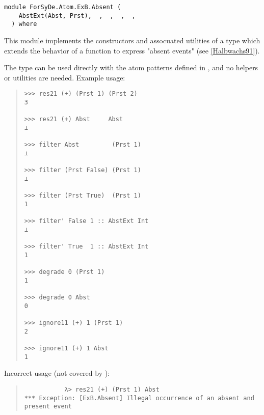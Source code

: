 \label{module:ForSyDe.Atom.ExB.Absent}
\haddockbeginheader
{\haddockverb\begin{verbatim}
module ForSyDe.Atom.ExB.Absent (
    AbstExt(Abst, Prst),  ,  ,  ,  , 
  ) where\end{verbatim}}
\haddockendheader

This module implements the constructors and assocuated utilities of
 a type which extends the behavior of a function to express "absent
 events" (see \href{ForSyDe-Atom.html#halbwachs91}{[Halbwachs91]}).\par
The  type can be used directly with the atom patterns
 defined in , and no helpers or utilities are
 needed. Example usage:\par
\begin{quote}
{\haddockverb\begin{verbatim}
>>> res21 (+) (Prst 1) (Prst 2)
3

>>> res21 (+) Abst     Abst
⟂

>>> filter Abst         (Prst 1)
⟂

>>> filter (Prst False) (Prst 1)
⟂

>>> filter (Prst True)  (Prst 1)
1

>>> filter' False 1 :: AbstExt Int
⟂

>>> filter' True  1 :: AbstExt Int
1

>>> degrade 0 (Prst 1)
1

>>> degrade 0 Abst
0

>>> ignore11 (+) 1 (Prst 1)
2

>>> ignore11 (+) 1 Abst
1

\end{verbatim}}
\end{quote}Incorrect usage (not covered by ):\par
           \begin{quote}
           {\haddockverb\begin{verbatim}
           λ> res21 (+) (Prst 1) Abst 
*** Exception: [ExB.Absent] Illegal occurrence of an absent and present event\end{verbatim}}
           \end{quote}
           
